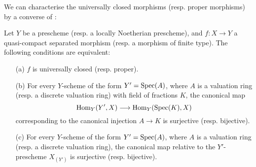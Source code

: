 We can characterise the universally closed morphisms (resp. proper morphisms) by a converse of :
\begin{theorem}[7.3.8]
\label{II.7.3.8}
Let $Y$ be a prescheme (resp. a locally Noetherian prescheme), and $f:X\to Y$ a quasi-compact separated morphism (resp. a morphism of finite type).
The following conditions are equivalent:
\begin{enumerate}
    \item[\rm{(a)}] $f$ is universally closed (resp. proper).
    \item[\rm{(b)}] For every $Y$-scheme of the form $Y'=\operatorname{Spec}(A)$, where $A$ is a valuation ring (resp. a discrete valuation ring) with field of fractions $K$, the canonical map
        \[
            \Hom_Y(Y',X) \to \Hom_Y(\Spec(K),X)
        \]
        corresponding to the canonical injection $A\to K$ is surjective (resp. bijective).
    \item[\rm{(c)}] For every $Y$-scheme of the form $Y'=\operatorname{Spec}(A)$, where $A$ is a valuation ring (resp. a discrete valuation ring), the canonical map  relative to the $Y'$-prescheme $X_{(Y')}$ is surjective (resp. bijective).
\end{enumerate}
\end{theorem}

